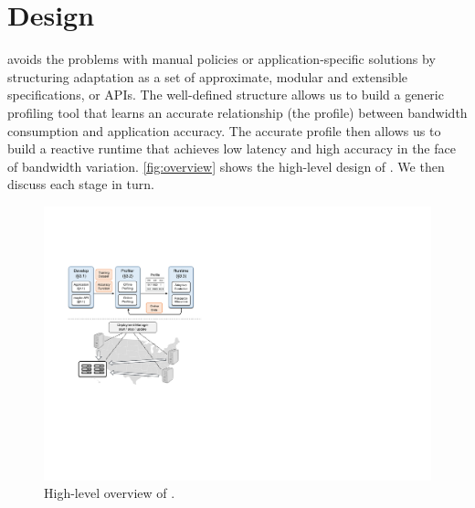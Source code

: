 \section{\sysname{} Design}
\label{sec:system}

\sysname{} avoids the problems with manual policies or application-specific
solutions by structuring adaptation as a set of approximate, modular and
extensible specifications, or APIs. The well-defined structure allows us to
build a generic profiling tool that learns an accurate relationship (the
profile) between bandwidth consumption and application accuracy. The accurate
profile then allows us to build a reactive runtime that achieves low latency and
high accuracy in the face of bandwidth variation. \autoref{fig:overview} shows
the high-level design of \sysname{}. We then discuss each stage in turn.

\begin{figure}
  \centering
  \includegraphics[width=.9\linewidth]{figures/system.pdf}
  \caption{High-level overview of \sysname{}.}
  \label{fig:overview}
\end{figure}





\newpage
\clearpage

